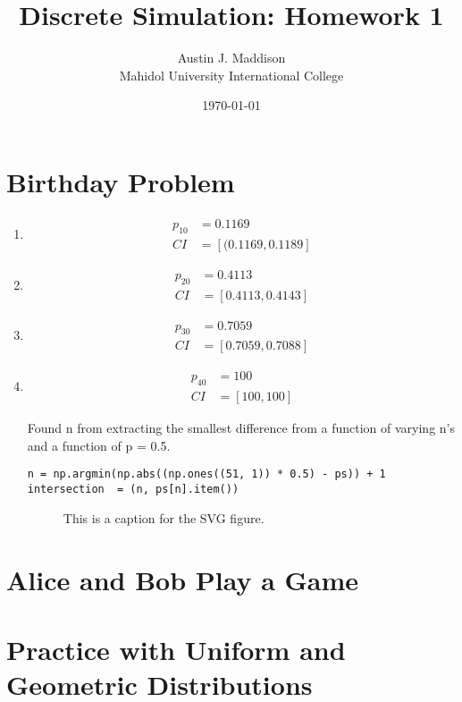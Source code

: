 \documentclass[twocolumn]{article}
\newcommand{\authorname}{Austin J. Maddison}
\begin{document}
\title{Discrete Simulation: Homework 1}
\author{\authorname \\ \small Mahidol University International College}
\date{\small \today}


%
\twocolumn[{
  \maketitle
}]

\section{Birthday Problem}

\begin{enumerate}[label=\alph*)]
    
\item \begin{align*}
p_{10} &= 0.1169 \\
CI &= [(0.1169, 0.1189]
\end{align*}
    
\item \begin{align*}
p_{20} &=  0.4113 \\
CI &= [0.4113, 0.4143]
\end{align*}

\item \begin{align*}
p_{30} &= 0.7059 \\
CI &= [0.7059, 0.7088]
\end{align*}


\item \begin{align*}
p_{40} &= 100 \\
CI &= [100, 100]
\end{align*}
	
Found n from extracting the smallest difference from a function of varying n's and a function of p = 0.5.
\vspace{-5pt}
\begin{lstlisting}
n = np.argmin(np.abs((np.ones((51, 1)) * 0.5) - ps)) + 1
intersection  = (n, ps[n].item())
\end{lstlisting}	
\vspace{-10pt}
	
\begin{figure}[H]
    \centering
    \caption{This is a caption for the SVG figure.}
    \label{fig:my_svg}
\end{figure}

\end{enumerate}

\section{Alice and Bob Play a Game}
\lipsum[3-4] %

\section{Practice with Uniform and Geometric Distributions}
\lipsum[5-6] %


%
%
\end{document}
